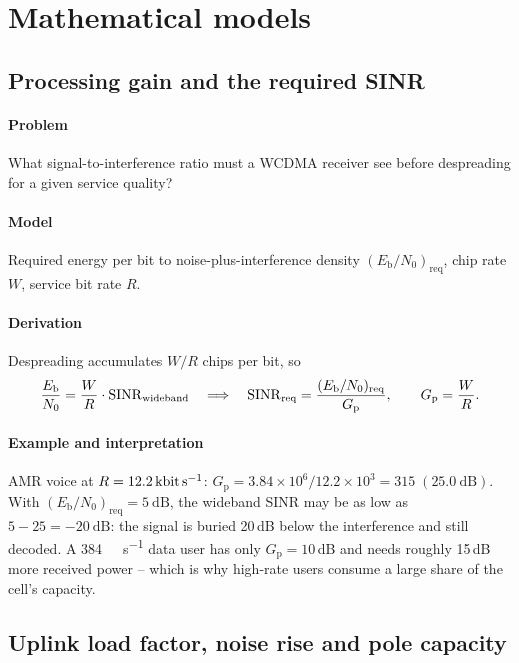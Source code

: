 \documentclass[11pt,a4paper]{article}
\begin{document}
\section{Mathematical models}

\subsection{Processing gain and the required SINR}\label{sec:pg}
\paragraph{Problem} What signal-to-interference ratio must a WCDMA receiver see before
despreading for a given service quality?
\paragraph{Model} Required energy per bit to noise-plus-interference density
$(E_\mathrm{b}/N_0)_{\mathrm{req}}$, chip rate $W$, service bit rate $R$.
\paragraph{Derivation} Despreading accumulates $W/R$ chips per bit, so
\begin{equation}\label{eq:ebno}
  \frac{E_\mathrm{b}}{N_0} = \frac{W}{R}\cdot\mathrm{SINR}_{\mathrm{wideband}}
  \quad\Longrightarrow\quad
  \mathrm{SINR}_{\mathrm{req}} = \frac{(E_\mathrm{b}/N_0)_{\mathrm{req}}}{G_\mathrm{p}}, \qquad G_\mathrm{p} = \frac{W}{R}.
\end{equation}
\paragraph{Example and interpretation} AMR voice at $R = \qty{12.2}{\kilo\bit\per\second}$:
$G_\mathrm{p} = 3.84\times10^6/12.2\times10^3 = 315 \;(\qty{25.0}{\dB})$. With
$(E_\mathrm{b}/N_0)_{\mathrm{req}} = \qty{5}{\dB}$, the wideband SINR may be as low as
$5-25 = \qty{-20}{\dB}$: the signal is buried 20\,dB below the interference and still decoded.
A \qty{384}{\kilo\bit\per\second} data user has only $G_\mathrm{p} = 10$\,dB and needs
roughly 15\,dB more received power -- which is why high-rate users consume a large share of the
cell's capacity.

\subsection{Uplink load factor, noise rise and pole capacity}\label{sec:load}
\end{document}
